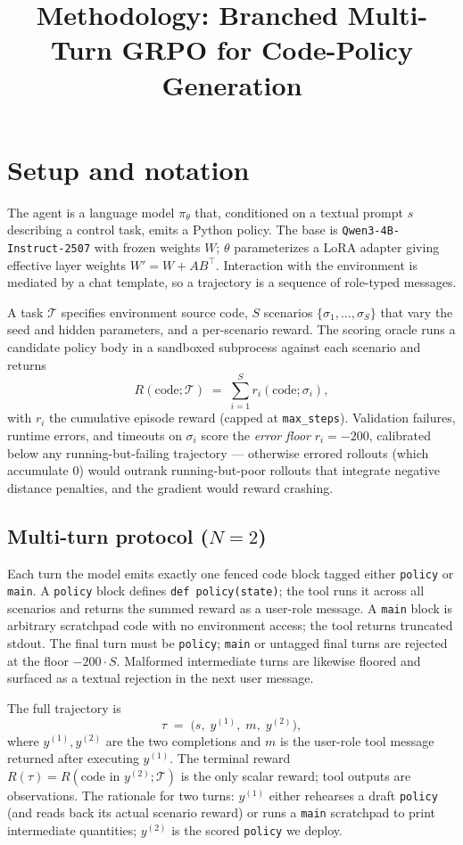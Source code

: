 \documentclass[11pt,a4paper]{article}
\title{\textbf{Methodology: Branched Multi-Turn GRPO for Code-Policy Generation}}
\author{}
\date{}
\begin{document}
\maketitle

\section{Setup and notation}

The agent is a language model $\pi_\theta$ that, conditioned on a textual
prompt $s$ describing a control task, emits a Python policy. The base is
\texttt{Qwen3-4B-Instruct-2507} with frozen weights $W$; $\theta$
parameterizes a LoRA adapter giving effective layer weights
$W' = W + AB^\top$. Interaction with the environment is mediated by a
chat template, so a trajectory is a sequence of role-typed messages.

A task $\mathcal{T}$ specifies environment source code, $S$ scenarios
$\{\sigma_1,\dots,\sigma_S\}$ that vary the seed and hidden parameters,
and a per-scenario reward. The scoring oracle runs a candidate policy
body in a sandboxed subprocess against each scenario and returns
\[
  R(\text{code};\mathcal{T}) \;=\; \sum_{i=1}^{S} r_i(\text{code};\sigma_i),
\]
with $r_i$ the cumulative episode reward (capped at \texttt{max\_steps}).
Validation failures, runtime errors, and timeouts on $\sigma_i$ score the
\emph{error floor} $r_i = -200$, calibrated below any running-but-failing
trajectory --- otherwise errored rollouts (which accumulate $0$) would
outrank running-but-poor rollouts that integrate negative distance
penalties, and the gradient would reward crashing.

\subsection{Multi-turn protocol ($N=2$)}

Each turn the model emits exactly one fenced code block tagged either
\texttt{policy} or \texttt{main}. A \texttt{policy} block defines
\texttt{def policy(state)}; the tool runs it across all scenarios and
returns the summed reward as a user-role message. A \texttt{main} block
is arbitrary scratchpad code with no environment access; the tool returns
truncated stdout. The final turn must be \texttt{policy}; \texttt{main}
or untagged final turns are rejected at the floor $-200\cdot S$.
Malformed intermediate turns are likewise floored and surfaced as a
textual rejection in the next user message.

The full trajectory is
\begin{equation}
  \tau \;=\; \big(s,\; y^{(1)},\; m,\; y^{(2)}\big),
  \label{eq:trajectory}
\end{equation}
where $y^{(1)}, y^{(2)}$ are the two completions and $m$ is the
user-role tool message returned after executing $y^{(1)}$. The terminal
reward $R(\tau) = R(\text{code in }y^{(2)};\mathcal{T})$ is the only
scalar reward; tool outputs are observations. The rationale for two
turns: $y^{(1)}$ either rehearses a draft \texttt{policy} (and reads
back its actual scenario reward) or runs a \texttt{main} scratchpad to
print intermediate quantities; $y^{(2)}$ is the scored
\texttt{policy} we deploy.
\end{document}
